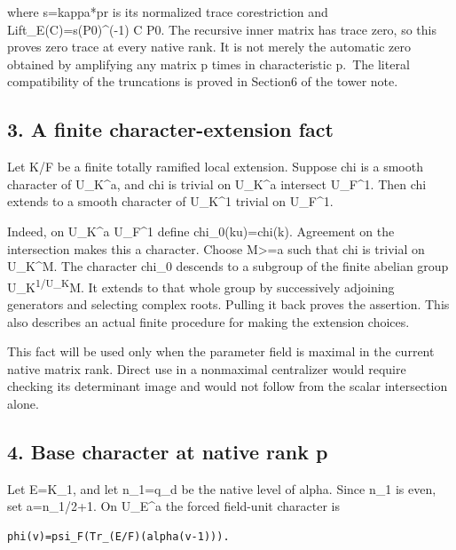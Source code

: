 where s=kappa*pr is its normalized trace corestriction and
Lift\_E(C)=s(P0)\^{}(-1) C P0. The recursive inner matrix has trace
zero, so this proves zero trace at every native rank. It is not merely
the automatic zero obtained by amplifying any matrix p times in
characteristic p.~The literal compatibility of the truncations is proved
in Section6 of the tower note.

\hypertarget{odd_character-a-finite-character-extension-fact}{%
\subsection{3. A finite character-extension
fact}\label{odd_character-a-finite-character-extension-fact}}

Let K/F be a finite totally ramified local extension. Suppose chi is a
smooth character of U\_K\^{}a, and chi is trivial on U\_K\^{}a intersect
U\_F\^{}1. Then chi extends to a smooth character of U\_K\^{}1 trivial
on U\_F\^{}1.

Indeed, on U\_K\^{}a U\_F\^{}1 define chi\_0(ku)=chi(k). Agreement on
the intersection makes this a character. Choose M\textgreater=a such
that chi is trivial on U\_K\^{}M. The character chi\_0 descends to a
subgroup of the finite abelian group U\_K\textsuperscript{1/U\_K}M. It
extends to that whole group by successively adjoining generators and
selecting complex roots. Pulling it back proves the assertion. This also
describes an actual finite procedure for making the extension choices.

This fact will be used only when the parameter field is maximal in the
current native matrix rank. Direct use in a nonmaximal centralizer would
require checking its determinant image and would not follow from the
scalar intersection alone.

\hypertarget{odd_character-base-character-at-native-rank-p}{%
\subsection{4. Base character at native rank
p}\label{odd_character-base-character-at-native-rank-p}}

Let E=K\_1, and let n\_1=q\_d be the native level of alpha. Since n\_1
is even, set a=n\_1/2+1. On U\_E\^{}a the forced field-unit character is

\begin{Verbatim}[fontsize=\small,breaklines=true,breakanywhere=true]
phi(v)=psi_F(Tr_(E/F)(alpha(v-1))).
\end{Verbatim}

